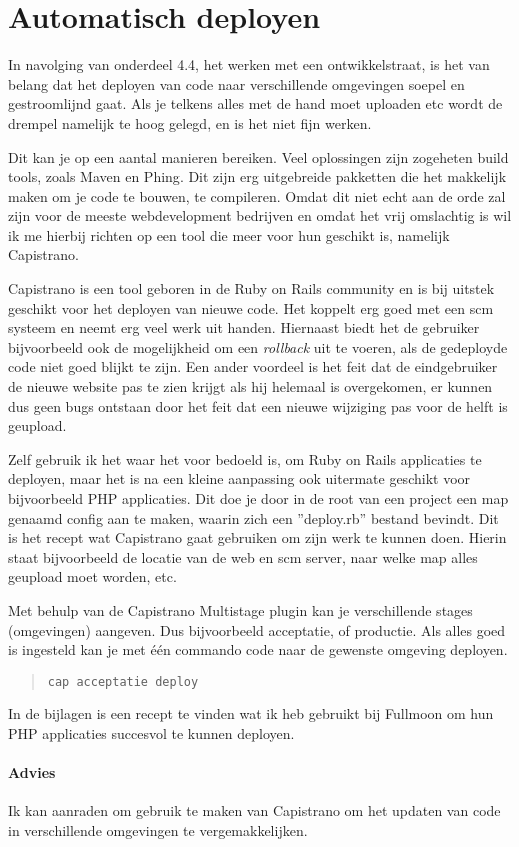 \section{Automatisch deployen}

In navolging van onderdeel 4.4, het werken met een ontwikkelstraat, is het van belang dat het deployen van code naar verschillende omgevingen soepel en gestroomlijnd gaat. Als je telkens alles met de hand moet uploaden etc wordt de drempel namelijk te hoog gelegd, en is het niet fijn werken.

Dit kan je op een aantal manieren bereiken. Veel oplossingen zijn zogeheten build tools, zoals Maven\cite{maven} en Phing\cite{phing}. Dit zijn erg uitgebreide pakketten die het makkelijk maken om je code te bouwen, te compileren. Omdat dit niet echt aan de orde zal zijn voor de meeste webdevelopment bedrijven en omdat het vrij omslachtig is wil ik me hierbij richten op een tool die meer voor hun geschikt is, namelijk Capistrano\cite{capistrano}.

Capistrano is een tool geboren in de Ruby on Rails community en is bij uitstek geschikt voor het deployen van nieuwe code. Het koppelt erg goed met een {\sc scm} systeem en neemt erg veel werk uit handen. Hiernaast biedt het de gebruiker bijvoorbeeld ook de mogelijkheid om een \emph{rollback} uit te voeren, als de gedeployde code niet goed blijkt te zijn. Een ander voordeel is het feit dat de eindgebruiker de nieuwe website pas te zien krijgt als hij helemaal is overgekomen, er kunnen dus geen bugs ontstaan door het feit dat een nieuwe wijziging pas voor de helft is geupload.

Zelf gebruik ik het waar het voor bedoeld is, om Ruby on Rails applicaties te deployen, maar het is na een kleine aanpassing ook uitermate geschikt voor bijvoorbeeld PHP applicaties. Dit doe je door in de root van een project een map genaamd config aan te maken, waarin zich een ''deploy.rb'' bestand bevindt. Dit is het recept wat Capistrano gaat gebruiken om zijn werk te kunnen doen. Hierin staat bijvoorbeeld de locatie van de web en {\sc scm} server, naar welke map alles geupload moet worden, etc.

Met behulp van de Capistrano Multistage plugin\cite{capistranomultistage} kan je verschillende stages (omgevingen) aangeven. Dus bijvoorbeeld acceptatie, of productie. Als alles goed is ingesteld kan je met \'{e}\'{e}n commando code naar de gewenste omgeving deployen.

\begin{quote}
  \texttt{cap acceptatie deploy}
\end{quote}

In de bijlagen is een recept te vinden wat ik heb gebruikt bij Fullmoon om hun PHP applicaties succesvol te kunnen deployen.

\paragraph{Advies} Ik kan aanraden om gebruik te maken van Capistrano om het updaten van code in verschillende omgevingen te vergemakkelijken.

